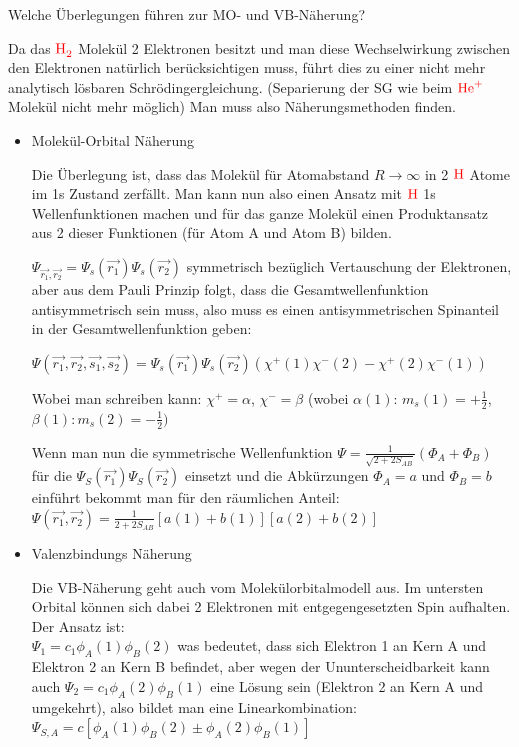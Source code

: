 \documentclass[a5paper,12pt,ngerman,grid=front %
,print
]{kartei}
\let\oldce\ce
\renewcommand*{\ce}[1]{\begingroup\color{red}\oldce{#1}\endgroup}
\begin{document}
	\begin{karte}{
		Welche Überlegungen führen zur MO- und VB-Näherung?
		}
			
		Da das $\ce{H2}$ Molekül 2 Elektronen besitzt und man diese Wechselwirkung zwischen 
		den Elektronen natürlich berücksichtigen muss, führt dies zu einer nicht mehr 
		analytisch lösbaren Schrödingergleichung. 
		(Separierung der SG wie beim $\ce{He^+}$ Molekül nicht mehr möglich)
		Man muss also Näherungsmethoden finden.
		
		\begin{itemize}
			\item Molekül-Orbital Näherung 
			
			Die Überlegung ist, dass das Molekül für Atomabstand $R \rightarrow \infty$ 
			in 2 $\ce{H}$ Atome im 1s Zustand zerfällt. 
			Man kann nun also einen Ansatz mit $\ce{H}$ 1s Wellenfunktionen machen und für 
			das ganze Molekül einen Produktansatz aus 2 dieser Funktionen 
			(für Atom A und Atom B) bilden.
			
			$\Psi_{\vec{r_1},\vec{r_2}} = \Psi_s(\vec{r_1})\Psi_s(\vec{r_2})$ symmetrisch bezüglich
			Vertauschung der Elektronen, aber aus dem Pauli Prinzip
			folgt, dass die Gesamtwellenfunktion antisymmetrisch sein muss, also muss es 
			einen antisymmetrischen Spinanteil in der Gesamtwellenfunktion geben:
			
			$\Psi(\vec{r_1},\vec{r_2},\vec{s_1},\vec{s_2})=
			\Psi_s(\vec{r_1})\Psi_s(\vec{r_2})(\chi^+(1)\chi^-(2) - \chi^+(2)\chi^-(1))$
			
			Wobei man schreiben kann: 
			$\chi^+ = \alpha$, $\chi^- = \beta$ 
			(wobei $\alpha(1)$: $m_s(1) = +\frac{1}{2}$, $\beta(1): m_s(2) = -\frac{1}{2})$
			
			Wenn man nun die symmetrische Wellenfunktion 
			$\Psi= \frac{1}{\sqrt{2+2S_{AB}}}(\Phi_A+\Phi_B)$
			für die $\Psi_S(\vec{r_1} ) \Psi_S(\vec{r_2} )$ einsetzt und die Abkürzungen $\Phi_A=a$ und 
			$\Phi_B=b$ einführt bekommt man für den räumlichen Anteil:
			$  \Psi( \vec{r_1}, \vec{r_2} ) = \frac{1}{2+2S_{AB}} \left[ a(1)+b(1) \right]\left[ a(2)+b(2) \right]   $
			
		\item Valenzbindungs Näherung 
		
		Die VB-Näherung geht auch vom Molekülorbitalmodell aus. 
		Im untersten Orbital können sich dabei 2 Elektronen mit entgegengesetzten Spin aufhalten. 
		Der Ansatz ist: \\
		$\Psi_1 = c_1 \phi_A(1) \phi_B(2)$ 
		was bedeutet, dass sich Elektron 1 an Kern A und Elektron 2 an Kern B befindet, 
		aber wegen der Ununterscheidbarkeit kann auch 
		$\Psi_2 = c_1 \phi_A(2) \phi_B(1)$
		eine Lösung sein (Elektron 2 an Kern A und umgekehrt), also bildet man eine Linearkombination:
		 $\Psi_{S,A} = c[ \phi_A(1) \phi_B(2) \pm \phi_A(2) \phi_B(1) ] $ 
			 
			
		\end{itemize}
		
	\end{karte}
		
\end{document}
